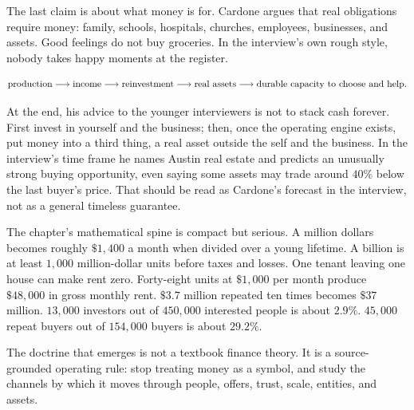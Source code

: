 The last claim is about what money is for. Cardone argues that real obligations require money: family, schools, hospitals, churches, employees, businesses, and assets. Good feelings do not buy groceries. In the interview's own rough style, nobody takes happy moments at the register.

\[
\hbox{production}
\longrightarrow
\hbox{income}
\longrightarrow
\hbox{reinvestment}
\longrightarrow
\hbox{real assets}
\longrightarrow
\hbox{durable capacity to choose and help}.
\]

At the end, his advice to the younger interviewers is not to stack cash forever. First invest in yourself and the business; then, once the operating engine exists, put money into a third thing, a real asset outside the self and the business. In the interview's time frame he names Austin real estate and predicts an unusually strong buying opportunity, even saying some assets may trade around \(40\%\) below the last buyer's price. That should be read as Cardone's forecast in the interview, not as a general timeless guarantee.

The chapter's mathematical spine is compact but serious. A million dollars becomes roughly \(\$1{,}400\) a month when divided over a young lifetime. A billion is at least \(1{,}000\) million-dollar units before taxes and losses. One tenant leaving one house can make rent zero. Forty-eight units at \(\$1{,}000\) per month produce \(\$48{,}000\) in gross monthly rent. \(\$3.7\) million repeated ten times becomes \(\$37\) million. \(13{,}000\) investors out of \(450{,}000\) interested people is about \(2.9\%\). \(45{,}000\) repeat buyers out of \(154{,}000\) buyers is about \(29.2\%\).

The doctrine that emerges is not a textbook finance theory. It is a source-grounded operating rule: stop treating money as a symbol, and study the channels by which it moves through people, offers, trust, scale, entities, and assets.